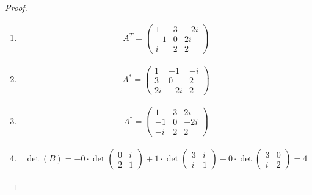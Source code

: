 \documentclass{article}
\begin{document}
\begin{proof}
\begin{enumerate}
\begin{align}
\begin{pmatrix}
            \end{pmatrix}-\begin{pmatrix}
                5&-5&5i\\3&0&2\\5-i&i&5
            \end{pmatrix} = \begin{pmatrix}
                -3&4+2i&-3i\\6+2i&4&3i\\-5-3i&4+i&-1
            \end{pmatrix}
        \end{align}
        \item \begin{align}
            A^T = \begin{pmatrix}
                1&3&-2i\\-1&0&2i\\i&2&2
            \end{pmatrix}
        \end{align}
        \item \begin{align}
            A^* =\begin{pmatrix}
                1&-1&-i\\3&0&2\\2i&-2i&2
            \end{pmatrix}
        \end{align}
        \item \begin{align}
            A^\dagger = \begin{pmatrix}
                1&3&2i\\-1&0&-2i\\-i&2&2
            \end{pmatrix}
        \end{align}
        \item \begin{align}
            \det(B) = - 0 \cdot \det\begin{pmatrix}
                0&i\\2&1
            \end{pmatrix} + 1\cdot\det\begin{pmatrix}
                3&i\\i&1
            \end{pmatrix} - 0\cdot \det\begin{pmatrix}
                3&0\\i&2
            \end{pmatrix} = 4
        \end{align}
    \end{enumerate}
\end{proof}
\end{document}
